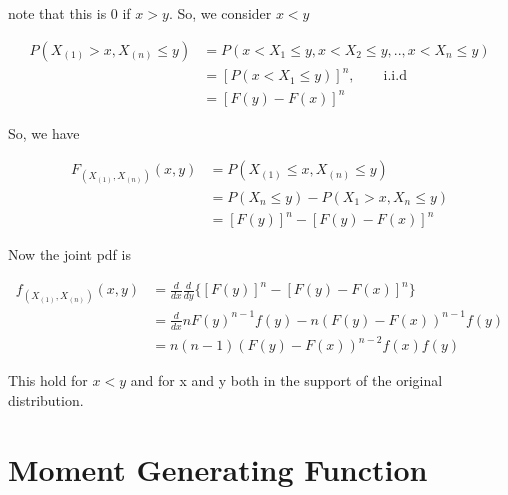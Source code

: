 \documentclass[11pt]{article} %
\begin{document}
note that this is 0 if $x > y$. So, we consider $x < y$

\begin{align*}
	P(X_{(1)} > x, X_{(n)} \leq y) &= P(x < X_{1} \leq y, x < X_{2} \leq y, .., x < X_{n} \leq y) \\
	&= [P(x < X_{1} \leq y)]^n, \qquad \text{i.i.d} \\
	&= [F(y)- F(x)]^n
\end{align*}

So, we have 

\begin{align*}
	F_{(X_{(1)}, X_{(n)})} (x,y) &= P(X_{(1)} \leq x, X_{(n)} \leq y) \\
	&= P(X_{n} \leq y) - P(X_{1} > x, X_{n} \leq y) \\
	&= [F(y)]^n - [F(y)- F(x)]^n
\end{align*}

Now the joint pdf is 

\begin{align*}
	f_{(X_{(1)}, X_{(n)})} (x,y) &= \frac{d}{dx} \frac{d}{dy} \{ [F(y)]^n - [F(y)- F(x)]^n\}\\
	&= \frac{d}{dx} n F(y)^{n-1} f(y) - n(F(y)- F(x))^{n-1} f(y) \\
	&= n (n-1) (F(y)- F(x))^{n-2} f(x) f(y)
\end{align*}

This hold for $x < y$ and for x and y both in the support of the original distribution.

\section{Moment Generating Function}
\end{document}
